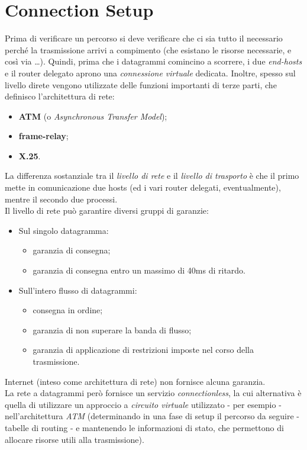 \section{Connection Setup}
Prima di verificare un percorso si deve verificare che ci sia tutto il necessario perché la trasmissione arrivi a compimento (che esistano le risorse necessarie, e così via \ldots). Quindi, prima che i datagrammi comincino a scorrere, i due \textit{end-hosts} e il router delegato aprono una \textit{connessione virtuale} dedicata. Inoltre, spesso sul livello direte vengono utilizzate delle funzioni importanti di terze parti, che definisco l'architettura di rete:
\begin{itemize}
	\item \textbf{ATM} (o \textit{Asynchronous Transfer Model});
	\item \textbf{frame-relay};
	\item \textbf{X.25}.
\end{itemize}
La differenza sostanziale tra il \textit{livello di rete} e il \textit{livello di trasporto} è che il primo mette in comunicazione due hosts (ed i vari router delegati, eventualmente), mentre il secondo due processi. \\
Il livello di rete può garantire diversi gruppi di garanzie:
\begin{itemize}
	\item Sul singolo datagramma:
	\begin{itemize}
		\item garanzia di consegna;
		\item garanzia di consegna entro un massimo di 40ms di ritardo.
	\end{itemize}
	\item Sull'intero flusso di datagrammi:
	\begin{itemize}
		\item consegna in ordine;
		\item garanzia di non superare la banda di flusso;
		\item garanzia di applicazione di restrizioni imposte nel corso della trasmissione.
	\end{itemize}
\end{itemize}
Internet (inteso come architettura di rete) non fornisce alcuna garanzia. \\
La rete a datagrammi però fornisce un servizio \textit{connectionless}, la cui alternativa è quella di utilizzare un approccio a \textit{circuito virtuale} utilizzato - per esempio - nell'architettura \textit{ATM} (determinando in una fase di setup il percorso da seguire - tabelle di routing - e mantenendo le informazioni di stato, che permettono di allocare risorse utili alla trasmissione).

